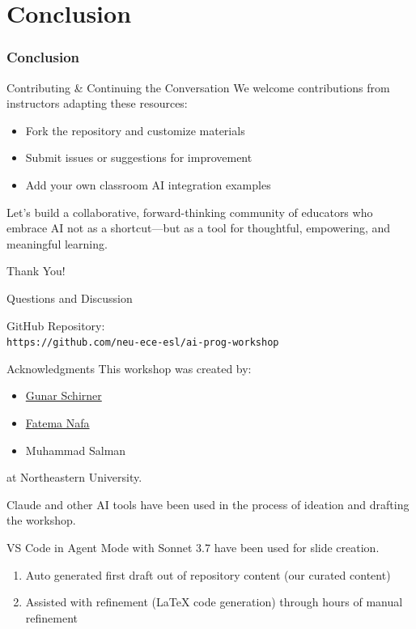 \documentclass[xcolor=dvipsnames, aspectratio=169]{beamer}
\begin{document}
\part[Conclusion]{Conclusion}
\section{Conclusion}

\begin{frame}{Contributing \& Continuing the Conversation}
  We welcome contributions from instructors adapting these resources:
  \begin{itemize}
    \item Fork the repository and customize materials
    \item Submit issues or suggestions for improvement
    \item Add your own classroom AI integration examples
  \end{itemize}
  
  Let's build a collaborative, forward-thinking community of educators who embrace AI not as a shortcut—but as a tool for thoughtful, empowering, and meaningful learning.
\end{frame}


\begin{frame}{Thank You!}
  \begin{center}
    \Large{Questions and Discussion}
    
    \vspace{2em}
    
    GitHub Repository:\\
    \texttt{https://github.com/neu-ece-esl/ai-prog-workshop}
  \end{center}
\end{frame}

\begin{frame}{Acknowledgments}
  This workshop was created by:
  \begin{itemize}
    \item \href{https://coe.northeastern.edu/people/schirner-gunar/}{Gunar Schirner}
    \item \href{https://coe.northeastern.edu/people/nafa-fatema/}{Fatema Nafa}
    \item Muhammad Salman
  \end{itemize}
  
  at Northeastern University.
  
  \vspace{1em}
  
  Claude and other AI tools have been used in the process of ideation and drafting the workshop.

  VS Code in Agent Mode with Sonnet 3.7 have been used for slide creation.
  \begin{enumerate}
    \item Auto generated first draft out of repository content (our curated content)  
    \item Assisted with refinement (LaTeX code generation) through hours of manual refinement
  \end{enumerate}
\end{frame}
\end{document}
